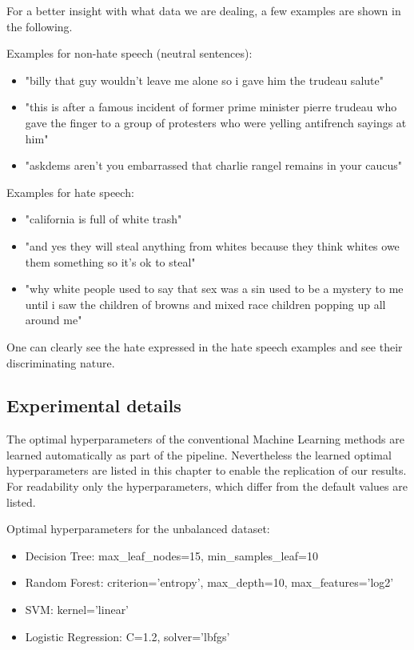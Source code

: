For a better insight with what data we are dealing, a few examples are shown in the following.

\noindent
Examples for non-hate speech (neutral sentences):
\begin{itemize}
    \item "billy that guy wouldn't leave me alone so i gave him the trudeau salute"
    \item "this is after a famous incident of former prime minister pierre trudeau who gave the finger to a group of protesters who were yelling antifrench sayings at him"
    \item "askdems aren't you embarrassed that charlie rangel remains in your caucus"
\end{itemize}

\noindent
Examples for hate speech:
\begin{itemize}
    \item "california is full of white trash"
    \item "and yes they will steal anything from whites because they think whites owe them something so it's ok to steal"
    \item "why white people used to say that sex was a sin used to be a mystery to me until i saw the children of browns and mixed race children popping up all around me"
\end{itemize}

One can clearly see the hate expressed in the hate speech examples and see their discriminating nature.

\subsection{Experimental details}


The optimal hyperparameters of the conventional Machine Learning methods are learned automatically as part of the pipeline. Nevertheless the learned optimal hyperparameters are listed in this chapter to enable the replication of our results. For readability only the hyperparameters, which differ from the default values are listed.

Optimal hyperparameters for the unbalanced dataset:
\begin{itemize}
	\item Decision Tree: max\_leaf\_nodes=15, min\_samples\_leaf=10
	\item Random Forest: criterion='entropy', max\_depth=10, max\_features='log2'
	\item SVM: kernel='linear'
	\item Logistic Regression: C=1.2, solver='lbfgs'
\end{itemize}

